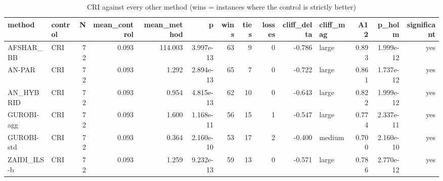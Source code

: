 \begin{table}[htbp]
\centering
\small
\caption{CRI against every other method (wins = instances where the control is strictly better)}
\label{tab:E10b_state_of_the_art_60s_b60_vs_CRI}
\begin{tabular}{llrrrrrrrrlrrr}
\toprule
method & control & N & mean\_control & mean\_method & p & wins & ties & losses & cliff\_delta & cliff\_mag & A12 & p\_holm & significant \\
\midrule
AFSHAR\_BB & CRI & 72 & 0.093 & 114.003 & 3.997e-13 & 63 & 9 & 0 & -0.786 & large & 0.893 & 1.999e-12 & yes \\
AN-PAR & CRI & 72 & 0.093 & 1.292 & 2.894e-13 & 65 & 7 & 0 & -0.722 & large & 0.861 & 1.737e-12 & yes \\
AN\_HYBRID & CRI & 72 & 0.093 & 0.954 & 4.815e-13 & 62 & 10 & 0 & -0.643 & large & 0.822 & 1.999e-12 & yes \\
GUROBI-agg & CRI & 72 & 0.093 & 1.600 & 1.168e-11 & 56 & 15 & 1 & -0.547 & large & 0.774 & 2.337e-11 & yes \\
GUROBI-std & CRI & 72 & 0.093 & 0.364 & 2.160e-10 & 53 & 17 & 2 & -0.400 & medium & 0.700 & 2.160e-10 & yes \\
ZAIDI\_ILS-b & CRI & 72 & 0.093 & 1.259 & 9.232e-13 & 59 & 13 & 0 & -0.571 & large & 0.786 & 2.770e-12 & yes \\
\bottomrule
\end{tabular}
\end{table}
